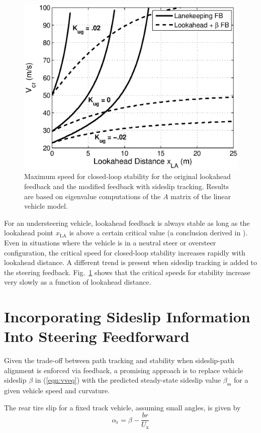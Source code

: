 \documentclass{nVSD2e}
\theoremstyle{plain}
\theoremstyle{definition}
\theoremstyle{remark}
\begin{document}
\begin{figure}[h]
\centering
\includegraphics[width=.75\columnwidth]{figures/VcrPlot.eps}
\caption{Maximum speed for closed-loop stability for the original lookahead feedback and the modified feedback with sideslip tracking. Results are based on
eigenvalue computations of the $A$ matrix of the linear vehicle model.}
\label{fig:VcrPlot}
\end{figure}

For an understeering vehicle, lookahead feedback is always stable as long
as the lookahead point $x_\mathrm{LA}$ is above a certain critical value (a conclusion derived in \cite{rosseter}). Even in situations where the vehicle is in a 
neutral steer or oversteer configuration, the critical speed for closed-loop stability increases rapidly with lookahead distance. A different trend is present when
sideslip tracking is added to the steering feedback. Fig.~\ref{fig:VcrPlot} shows that the critical speeds for 
stability increase very slowly as a function of lookahead distance.

\section{Incorporating Sideslip Information Into Steering Feedforward}
\label{sec:goodFFW}
 
 Given the trade-off between path tracking and stability when sideslip-path alignment is enforced via feedback, a promising approach
 is to replace vehicle sideslip  $\beta$ in (\ref{eqn:vveq}) with the predicted steady-state sideslip value $\beta_\mathrm{ss}$ 
 for a given vehicle speed and curvature. 

The rear tire slip for a fixed track vehicle, assuming small angles, is given by 
\begin{equation}
\alpha_\mathrm{r} = \beta - \frac{br}{U_\mathrm{x}}
\end{equation} 
\end{document}
